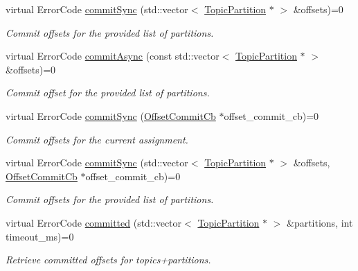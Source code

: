 \begin{DoxyCompactItemize}
virtual ErrorCode \hyperlink{classRdKafka_1_1KafkaConsumer_a892f5ec51f898b67a19d892b9ab08177}{commitSync} (std::vector$<$ \hyperlink{classRdKafka_1_1TopicPartition}{TopicPartition} $\ast$ $>$ \&offsets)=0
\begin{DoxyCompactList}\small\item\em Commit offsets for the provided list of partitions. \item\end{DoxyCompactList}\item 
virtual ErrorCode \hyperlink{classRdKafka_1_1KafkaConsumer_a66a2c7639521e0c9eb25c3417921e318}{commitAsync} (const std::vector$<$ \hyperlink{classRdKafka_1_1TopicPartition}{TopicPartition} $\ast$ $>$ \&offsets)=0
\begin{DoxyCompactList}\small\item\em Commit offset for the provided list of partitions. \item\end{DoxyCompactList}\item 
virtual ErrorCode \hyperlink{classRdKafka_1_1KafkaConsumer_a6791befdd7d705be26e5ed69cf219376}{commitSync} (\hyperlink{classRdKafka_1_1OffsetCommitCb}{OffsetCommitCb} $\ast$offset\_\-commit\_\-cb)=0
\begin{DoxyCompactList}\small\item\em Commit offsets for the current assignment. \item\end{DoxyCompactList}\item 
virtual ErrorCode \hyperlink{classRdKafka_1_1KafkaConsumer_aaa28c44fe9505f48644f06f49403fcc3}{commitSync} (std::vector$<$ \hyperlink{classRdKafka_1_1TopicPartition}{TopicPartition} $\ast$ $>$ \&offsets, \hyperlink{classRdKafka_1_1OffsetCommitCb}{OffsetCommitCb} $\ast$offset\_\-commit\_\-cb)=0
\begin{DoxyCompactList}\small\item\em Commit offsets for the provided list of partitions. \item\end{DoxyCompactList}\item 
virtual ErrorCode \hyperlink{classRdKafka_1_1KafkaConsumer_aad4b300803fd1c9403c165b9a6431612}{committed} (std::vector$<$ \hyperlink{classRdKafka_1_1TopicPartition}{TopicPartition} $\ast$ $>$ \&partitions, int timeout\_\-ms)=0
\begin{DoxyCompactList}\small\item\em Retrieve committed offsets for topics+partitions. \item\end{DoxyCompactList}\item 

\end{DoxyCompactItemize}
